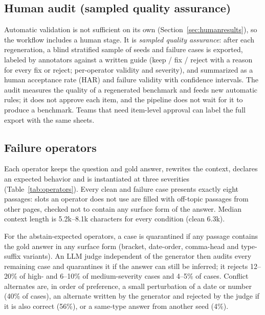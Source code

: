 \documentclass[conference]{IEEEtran}
\newcommand{\op}[1]{\texttt{\detokenize{#1}}}
\begin{document}
\subsection{Human audit (sampled quality assurance)}
\label{sec:audit}
Automatic validation is not sufficient on its own (Section~\ref{sec:humanresults}), so the
workflow includes a human stage. It is \emph{sampled quality assurance}: after each
regeneration, a blind stratified sample of seeds and failure cases is exported, labeled by
annotators against a written guide (keep / fix / reject with a reason for every fix or reject;
per-operator validity and severity), and summarized as a human acceptance rate (HAR) and failure
validity with confidence intervals. The audit measures the quality of a regenerated benchmark
and feeds new automatic rules; it does not approve each item, and the pipeline does not wait for
it to produce a benchmark. Teams that need item-level approval can label the full export with
the same sheets.

\subsection{Failure operators}
\label{sec:operators}
Each operator keeps the question and gold answer, rewrites the context, declares an expected
behavior and is instantiated at three severities (Table~\ref{tab:operators}). Every clean and
failure case presents exactly eight passages: slots an operator does not use are filled with
off-topic passages from other pages, checked not to contain any surface form of the answer.
Median context length is 5.2k--8.1k characters for every condition (clean 6.3k).

For the abstain-expected operators, a case is quarantined if any passage contains the gold
answer in any surface form (bracket, date-order, comma-head and type-suffix variants). An LLM
judge independent of the generator then audits every remaining case and quarantines it if the
answer can still be inferred; it rejects 12--20\% of high- and 6--10\% of medium-severity
\op{missing_evidence} cases and 4--5\% of \op{hard_negative} cases. Conflict alternates are,
in order of preference, a small perturbation of a date or number (40\% of cases), an
alternate written by the generator and rejected by the judge if it is also correct (56\%), or a
same-type answer from another seed (4\%).
\end{document}
